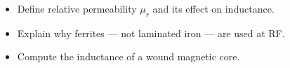 \begin{objectives}
\begin{itemize}[leftmargin=1.4em,itemsep=2pt]
\item Define relative permeability $\mu_r$ and its effect on inductance.
\item Explain why ferrites --- not laminated iron --- are used at RF.
\item Compute the inductance of a wound magnetic core.
\end{itemize}
\end{objectives}
